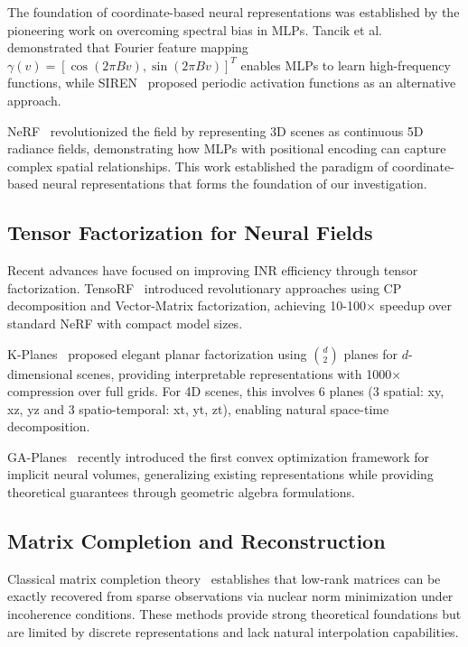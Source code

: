 \documentclass{article}
\begin{document}
The foundation of coordinate-based neural representations was established by the pioneering work on overcoming spectral bias in MLPs. Tancik et al.~\cite{tancik2020fourier} demonstrated that Fourier feature mapping $\gamma(v) = [\cos(2\pi Bv), \sin(2\pi Bv)]^T$ enables MLPs to learn high-frequency functions, while SIREN~\cite{sitzmann2020siren} proposed periodic activation functions as an alternative approach.

NeRF~\cite{mildenhall2020nerf} revolutionized the field by representing 3D scenes as continuous 5D radiance fields, demonstrating how MLPs with positional encoding can capture complex spatial relationships. This work established the paradigm of coordinate-based neural representations that forms the foundation of our investigation.

\subsection{Tensor Factorization for Neural Fields}

Recent advances have focused on improving INR efficiency through tensor factorization. TensoRF~\cite{chen2022tensorf} introduced revolutionary approaches using CP decomposition and Vector-Matrix factorization, achieving 10-100× speedup over standard NeRF with compact model sizes.

K-Planes~\cite{fridovich2023kplanes} proposed elegant planar factorization using $\binom{d}{2}$ planes for $d$-dimensional scenes, providing interpretable representations with 1000× compression over full grids. For 4D scenes, this involves 6 planes (3 spatial: xy, xz, yz and 3 spatio-temporal: xt, yt, zt), enabling natural space-time decomposition.

GA-Planes~\cite{sivgin2024gaplanes} recently introduced the first convex optimization framework for implicit neural volumes, generalizing existing representations while providing theoretical guarantees through geometric algebra formulations.

\subsection{Matrix Completion and Reconstruction}

Classical matrix completion theory~\cite{candes2009matrix,recht2011simpler} establishes that low-rank matrices can be exactly recovered from sparse observations via nuclear norm minimization under incoherence conditions. These methods provide strong theoretical foundations but are limited by discrete representations and lack natural interpolation capabilities.
\end{document}
